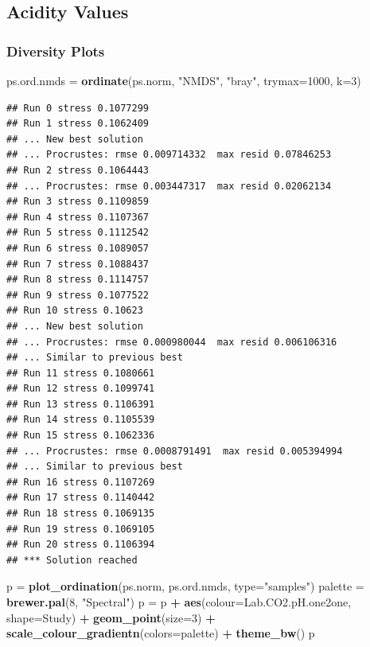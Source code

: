 \documentclass[]{article}
\newenvironment{Shaded}{\begin{snugshade}}{\end{snugshade}}
\newcommand{\DataTypeTok}[1]{\textcolor[rgb]{0.13,0.29,0.53}{#1}}
\newcommand{\DecValTok}[1]{\textcolor[rgb]{0.00,0.00,0.81}{#1}}
\newcommand{\KeywordTok}[1]{\textcolor[rgb]{0.13,0.29,0.53}{\textbf{#1}}}
\newcommand{\NormalTok}[1]{#1}
\newcommand{\OperatorTok}[1]{\textcolor[rgb]{0.81,0.36,0.00}{\textbf{#1}}}
\newcommand{\StringTok}[1]{\textcolor[rgb]{0.31,0.60,0.02}{#1}}
\begin{document}
\hypertarget{acidity-values}{%
\subsection{Acidity Values}\label{acidity-values}}

\hypertarget{diversity-plots}{%
\subsubsection{Diversity Plots}\label{diversity-plots}}

\begin{Shaded}
\begin{Highlighting}[]
\NormalTok{ps.ord.nmds =}\StringTok{ }\KeywordTok{ordinate}\NormalTok{(ps.norm, }\StringTok{"NMDS"}\NormalTok{, }\StringTok{"bray"}\NormalTok{, }\DataTypeTok{trymax=}\DecValTok{1000}\NormalTok{, }\DataTypeTok{k=}\DecValTok{3}\NormalTok{)}
\end{Highlighting}
\end{Shaded}

\begin{verbatim}
## Run 0 stress 0.1077299 
## Run 1 stress 0.1062409 
## ... New best solution
## ... Procrustes: rmse 0.009714332  max resid 0.07846253 
## Run 2 stress 0.1064443 
## ... Procrustes: rmse 0.003447317  max resid 0.02062134 
## Run 3 stress 0.1109859 
## Run 4 stress 0.1107367 
## Run 5 stress 0.1112542 
## Run 6 stress 0.1089057 
## Run 7 stress 0.1088437 
## Run 8 stress 0.1114757 
## Run 9 stress 0.1077522 
## Run 10 stress 0.10623 
## ... New best solution
## ... Procrustes: rmse 0.000980044  max resid 0.006106316 
## ... Similar to previous best
## Run 11 stress 0.1080661 
## Run 12 stress 0.1099741 
## Run 13 stress 0.1106391 
## Run 14 stress 0.1105539 
## Run 15 stress 0.1062336 
## ... Procrustes: rmse 0.0008791491  max resid 0.005394994 
## ... Similar to previous best
## Run 16 stress 0.1107269 
## Run 17 stress 0.1140442 
## Run 18 stress 0.1069135 
## Run 19 stress 0.1069105 
## Run 20 stress 0.1106394 
## *** Solution reached
\end{verbatim}

\begin{Shaded}
\begin{Highlighting}[]
\NormalTok{p =}\StringTok{ }\KeywordTok{plot_ordination}\NormalTok{(ps.norm, ps.ord.nmds, }\DataTypeTok{type=}\StringTok{"samples"}\NormalTok{)}
\NormalTok{palette =}\StringTok{ }\KeywordTok{brewer.pal}\NormalTok{(}\DecValTok{8}\NormalTok{, }\StringTok{"Spectral"}\NormalTok{)}
\NormalTok{p =}\StringTok{ }\NormalTok{p }\OperatorTok{+}\StringTok{ }\KeywordTok{aes}\NormalTok{(}\DataTypeTok{colour=}\NormalTok{Lab.CO2.pH.one2one, }\DataTypeTok{shape=}\NormalTok{Study) }\OperatorTok{+}\StringTok{ }\KeywordTok{geom_point}\NormalTok{(}\DataTypeTok{size=}\DecValTok{3}\NormalTok{) }\OperatorTok{+}\StringTok{ }
\StringTok{  }\KeywordTok{scale_colour_gradientn}\NormalTok{(}\DataTypeTok{colors=}\NormalTok{palette) }\OperatorTok{+}\StringTok{ }
\StringTok{  }\KeywordTok{theme_bw}\NormalTok{()}
\NormalTok{p}
\end{Highlighting}
\end{Shaded}
\end{document}
